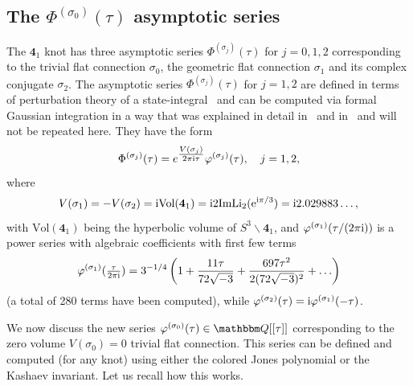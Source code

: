 \documentclass[12pt,reqno]{amsart}
\theoremstyle{definition}
\def\BQ{\mathbbm Q}
\def\s{\sigma}
\def\Li{\mathrm{Li}}
\def\ri{\mathrm{i}}
\def\re{{\rm e}}
\def\ri{{\rm i}}
\def\md{\mathbf}
\newcommand{\knot}[1]{\md{#1}}
\begin{document}
\subsection{The $\Phi^{(\s_0)}(\tau)$ asymptotic series}
\label{sub.413Phi}

The $\knot{4}_1$ knot has three asymptotic series $\Phi^{(\s_j)}(\tau)$ for $j=0,1,2$
corresponding to the trivial flat connection $\s_0$, the geometric flat connection
$\s_1$ and its complex conjugate $\s_2$. The asymptotic series $\Phi^{(\s_j)}(\tau)$
for $j=1,2$ are defined in terms of perturbation theory of a state-integral~\cite{DG}
and can be computed via formal Gaussian integration in a way that was explained in
detail in~\cite{GGM:resurgent} and in~\cite{GZ:kashaev} and will not be repeated here.
They have the form
\begin{equation}
  \Phi^{(\s_j)}(\tau) = e^{\tfrac{V(\s_j)}{2\pi\ri\tau}}
  \varphi^{(\s_j)}(\tau)
  ,\quad j=1,2,
\end{equation}
where
\begin{equation}
  V(\s_1) = -V(\s_2) = \ri \text{Vol}(\knot{4}_1)
  = \ri 2\text{Im} \Li_2(\re^{\ri \pi/3}) = \ri 2.029883\ldots,
\end{equation}
with $\text{Vol}(\knot{4}_1)$ being the hyperbolic volume of
$S^3\backslash \knot{4}_1$, and $\varphi^{(\s_1)}(\tau/(2\pi\ri))$ is
a power series with algebraic coefficients with first few terms
\begin{equation}
  \varphi^{(\s_1)}(\tfrac{\tau}{2\pi\ri})%
  = 3^{-1/4}\left(
    1+\frac{11\tau}{72\sqrt{-3}}
    +\frac{697\tau^2}{2(72\sqrt{-3})^2}+\ldots\right)
\end{equation}
(a total of 280 terms have been computed), while
$\varphi^{(\s_2)}(\tau) = \ri\varphi^{(\s_1)}(-\tau)$.

We now discuss the new series $\varphi^{(\s_0)}(\tau) \in \BQ[[\tau]]$ corresponding
to the zero volume $V(\s_0)=0$ trivial flat connection. This series can be defined
and computed (for any knot) using either the colored Jones polynomial or the Kashaev
invariant. Let us recall how this works.
\end{document}
